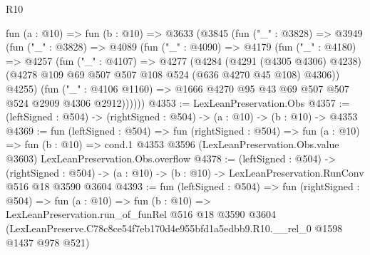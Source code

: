 \begin{lexlean}{R10}
\begin{coremodule}
  fun (a : @10) =>
  fun (b : @10) =>
  @3633
    (@3845
      (fun ("_" : @3828) =>
      @3949
        (fun ("_" : @3828) =>
        @4089
          (fun ("_" : @4090) =>
          @4179
            (fun ("_" : @4180) =>
            @4257
              (fun ("_" : @4107) =>
              @4277
                (@4284
                  (@4291 (@4305 @4306) @4238)
                  (@4278 @109 @69 @507 @507 @108 @524 (@636 @4270 @45 @108) @4306))
                @4255)
              (fun ("_" : @4106 @1160) =>
              @1666 @4270 @95 @43 @69 @507 @507 @524 @2909 @4306 @2912))))))
@4353 := LexLeanPreservation.Obs
@4357 := (leftSigned : @504) -> (rightSigned : @504) -> (a : @10) -> (b : @10) -> @4353
@4369 := fun (leftSigned : @504) =>
  fun (rightSigned : @504) =>
  fun (a : @10) =>
  fun (b : @10) =>
  cond.{1} @4353 @3596 (LexLeanPreservation.Obs.value @3603) LexLeanPreservation.Obs.overflow
@4378 := (leftSigned : @504) ->
  (rightSigned : @504) -> (a : @10) -> (b : @10) -> LexLeanPreservation.RunConv @516 @18 @3590 @3604
@4393 := fun (leftSigned : @504) =>
  fun (rightSigned : @504) =>
  fun (a : @10) =>
  fun (b : @10) =>
  LexLeanPreservation.run_of_funRel
    @516
    @18
    @3590
    @3604
    (LexLeanPreserve.C78c8ce54f7eb170d4e955bfd1a5edbb9.R10.__rel_0 @1598 @1437 @978 @521)
\end{coremodule}
\end{lexlean}
